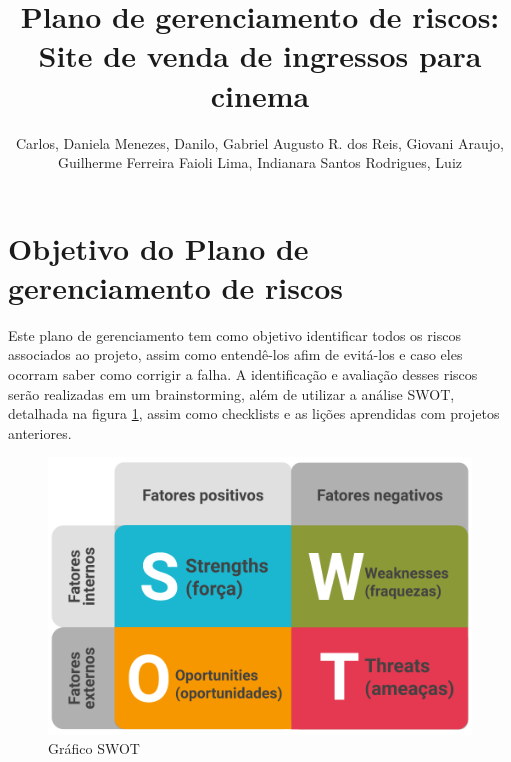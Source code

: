 \documentclass[12pt]{article}
\title{Plano de gerenciamento de riscos:\\Site de venda de ingressos para cinema}
\author{
    \begin{minipage}{\textwidth}
        Carlos\inst{1},
        Daniela Menezes\inst{1},
        Danilo\inst{1},
        Gabriel Augusto R. dos Reis\inst{1},
        Giovani Araujo\inst{1},
        Guilherme Ferreira Faioli Lima\inst{1},
        Indianara Santos Rodrigues\inst{1},
        Luiz\inst{1}
    \end{minipage}
}
\begin{document}
    \maketitle

    
    \section{Objetivo do Plano de gerenciamento de riscos}
        Este plano de gerenciamento tem como objetivo identificar todos os riscos associados ao projeto, assim como entendê-los afim de evitá-los e caso eles ocorram saber como corrigir a falha. A identificação e avaliação desses riscos serão realizadas em um brainstorming, além de utilizar a análise SWOT, detalhada na figura \ref{fig:swot}, assim como checklists e as lições aprendidas com projetos anteriores.
        \begin{figure}[h!]
                \centering
                \includegraphics[scale=0.3]{./Images/swot.png}
                \caption{Gráfico SWOT}
                \label{fig:swot}
            \end{figure}
\end{document}

